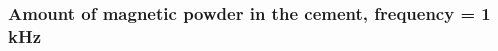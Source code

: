 \documentclass[aspectratio=169]{beamer}
\begin{document}
%
%
\begin{frame}

\frametitle{Amount of magnetic powder in the cement, frequency = 1 kHz}



\end{frame}
\end{document}
